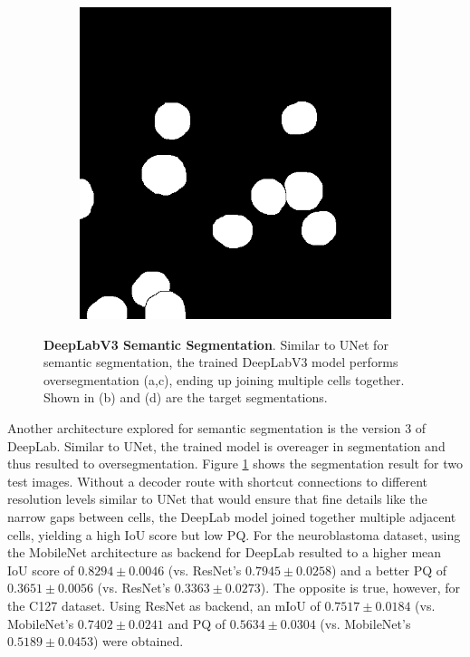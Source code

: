 \documentclass[10pt, journal, compsoc]{IEEEtran}
\begin{document}
\begin{figure}
\begin{subfigure}[b]{0.49\linewidth}
\caption{}
\end{subfigure}
\begin{subfigure}[b]{0.49\linewidth}
\includegraphics[width=\linewidth]{c127/108641-label.jpg}
\caption{}
\end{subfigure}
\caption{\textbf{DeepLabV3 Semantic Segmentation}. Similar to UNet for semantic segmentation, the trained DeepLabV3 model performs oversegmentation (a,c), ending up joining multiple cells together. Shown in (b) and (d) are the target segmentations.}
\label{fig:deeplab_results}
\end{figure}
Another architecture explored for semantic segmentation is the version 3 of DeepLab\cite{DBLP:journals/corr/ChenPSA17}. Similar to UNet, the trained model is overeager in segmentation and thus resulted to oversegmentation. Figure \ref{fig:deeplab_results} shows the segmentation result for two test images. Without a decoder route with shortcut connections to different resolution levels similar to UNet that would ensure that fine details like the narrow gaps between cells, the DeepLab model joined together multiple adjacent cells, yielding a high IoU score but low PQ. For the neuroblastoma dataset, using the MobileNet architecture as backend for DeepLab resulted to a higher mean IoU score of $0.8294\pm0.0046$ (vs. ResNet's $0.7945\pm0.0258$) and a better PQ of $0.3651\pm0.0056$ (vs. ResNet's $0.3363\pm0.0273$). The opposite is true, however, for the C127 dataset. Using ResNet as backend, an mIoU of $0.7517\pm0.0184$ (vs. MobileNet's $0.7402\pm0.0241$ and PQ of $0.5634\pm0.0304$ (vs. MobileNet's $0.5189\pm0.0453$) were obtained.
\end{document}
